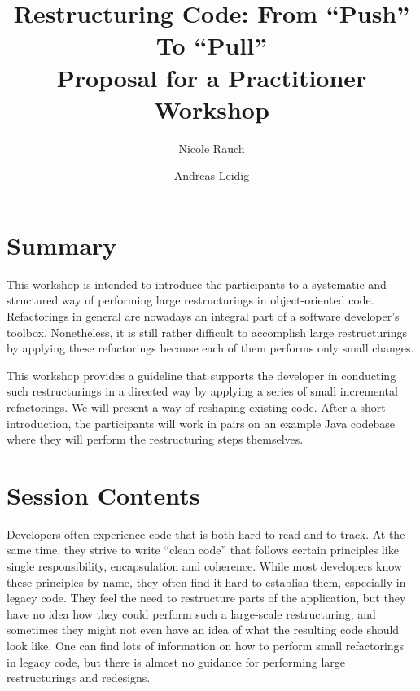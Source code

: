 \documentclass[a4,11pt]{article}
\begin{document}
	
\title{
Restructuring Code: From ``Push''  To ``Pull''\\
{\large Proposal for a Practitioner Workshop}
}
\author{
Nicole Rauch
\and
Andreas Leidig
}
\date{}

\maketitle

\thispagestyle{empty}


\section*{Summary}

This workshop is intended to introduce the participants to a systematic and structured way of performing large restructurings in object-oriented code.
Refactorings in general are nowadays an integral part of a software developer's toolbox.
Nonetheless, it is still rather difficult to accomplish large restructurings by applying these refactorings because each of them performs only small changes.

This workshop provides a guideline that supports the developer in conducting such restructurings in a directed way by applying a series of small incremental refactorings.
We will present a way of reshaping existing code. After a short introduction, the participants will work in pairs on an example Java codebase where they will perform the restructuring steps themselves. 

\section*{Session Contents}

Developers often experience code that is both hard to read and to track. At the same time, they strive to write  ``clean code'' that follows certain principles like single responsibility, encapsulation and coherence. 
While most developers know these principles by name, they often find it hard to establish them, especially in legacy code.
They feel the need to restructure parts of the application, but they have no idea how they could perform such a large-scale restructuring, and sometimes they might not even have an idea of what the resulting code should look like.
One can find lots of information on how to perform small refactorings in legacy code, but there is almost no guidance for performing large restructurings and redesigns.
\end{document}
